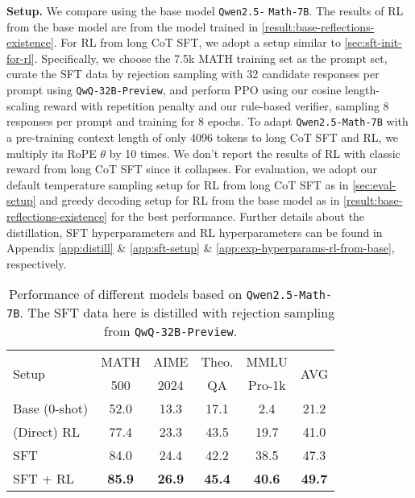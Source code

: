\noindent\textbf{Setup.}
We compare using the base model \texttt{Qwen2.5-} \texttt{Math-7B}. The results of RL from the base model are from the model trained in \textsection\ref{result:base-reflections-existence}. For RL from long CoT SFT, we adopt a setup similar to \textsection\ref{sec:sft-init-for-rl}. Specifically, we choose the 7.5k MATH training set as the prompt set, curate the SFT data by rejection sampling with 32 candidate responses per prompt using \texttt{QwQ-32B-Preview}, and perform PPO using our cosine length-scaling reward with repetition penalty and our rule-based verifier, sampling 8 responses per prompt and training for 8 epochs. To adapt \texttt{Qwen2.5-Math-7B} with a pre-training context length of only 4096 tokens to long CoT SFT and RL, we multiply its RoPE \citep{su2024rope} $\theta$ by 10 times. We don't report the results of RL with classic reward from long CoT SFT since it collapses. For evaluation, we adopt our default temperature sampling setup for RL from long CoT SFT as in \textsection\ref{sec:eval-setup} and greedy decoding setup for RL from the base model as in \textsection\ref{result:base-reflections-existence} for the best performance. Further details about the distillation, SFT hyperparameters and RL hyperparameters can be found in Appendix \ref{app:distill} \& \ref{app:sft-setup} \& \ref{app:exp-hyperparams-rl-from-base}, respectively.

\begin{table}[htbp]
\caption{
Performance of different models based on \texttt{Qwen2.5-Math-7B}. The SFT data here is distilled with rejection sampling from \texttt{QwQ-32B-Preview}.
}
\label{tab:rl-from-base-vs-from-long-sft-rl}
\vskip 0.1in
\centering
\small
\begin{tabular}{@{}lccccc@{}}
\toprule
\multirow{2}{*}{Setup} & MATH & AIME & Theo. & MMLU & \multirow{2}{*}{AVG}\\
& 500 & 2024 & QA & Pro-1k \\
\midrule
Base (0-shot) & 52.0 & 13.3 & 17.1 & 2.4 & 21.2 \\
(Direct) RL & 77.4 & 23.3 & 43.5 & 19.7 & 41.0 \\
SFT  & 84.0 & 24.4 & 42.2 & 38.5 & 47.3 \\
SFT + RL & \textbf{85.9} & \textbf{26.9} & \textbf{45.4} & \textbf{40.6} & \textbf{49.7} \\
\bottomrule
\end{tabular}
\end{table}

